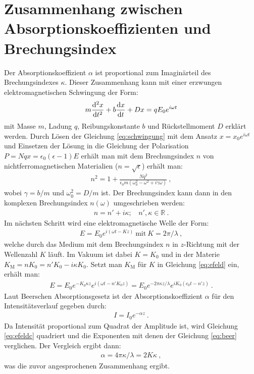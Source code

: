 
\section{Zusammenhang zwischen Absorptionskoeffizienten und Brechungsindex}
\label{sec:absorpBrechung}

Der Absorptionskoeffizient $\alpha$ ist proportional zum Imaginärteil des Brechungsindexes $\kappa$.  Dieser Zusammenhang kann mit einer erzwungen elektromagnetischen Schwingung der Form:
\begin{gather}
    m \derivative[2]{x}{t} + b \derivative{x}{t} + Dx = q E_0e^{i\omega t}
    \label{eq:schwingung}
\end{gather}
mit Masse $m$, Ladung $q$, Reibungskonstante $b$ und Rückstellmoment $D$ erklärt werden. Durch Lösen der Gleichung \ref{eq:schwingung} mit dem Ansatz $x=x_0e^{i\omega t}$ und Einsetzen der Lösung in die Gleichung der Polarisation $P = Nqx = \epsilon_0(\epsilon-1)E$ erhält man mit dem Brechungsindex $n$ von nichtferromagnetischen Materialien ($n = \sqrt{\epsilon}$) erhält man:
\begin{gather}
    n^2 = 1 + \frac{Nq^2}{\epsilon_0 m (\omega_0^2 - \omega^2 + i\gamma\omega)}~,
    \label{eq:brechungsindex}
\end{gather}
wobei $\gamma = b/m$ und $\omega_0^2 = D/m$ ist. Der Brechungsindex kann dann in den komplexen Brechungsindex $n(\omega)$ umgeschrieben werden:
\begin{gather}
    n = n' + i\kappa;~~~~ n',\kappa \in \mathbb{R}~.
\end{gather}
Im nächsten Schritt wird eine elektromagnetische Welle der Form:
\begin{gather}
    E = E_0 e^{i(\omega t - Kz)}~\mathrm{mit}~K = 2\pi/\lambda~,
    \label{eq:efeld}
\end{gather}
welche durch das Medium mit dem Brechungsindex $n$ in $z$-Richtung mit der Wellenzahl $K$ läuft. Im Vakuum ist dabei $K = K_0$ und in der Materie $K_\mathrm{M} = nK_0 = n'K_0 -i\kappa K_0$. Setzt man $K_\mathrm{M}$ für $K$ in Gleichung \ref{eq:efeld} ein, erhält man:
\begin{gather}
    E = E_0e^{-K_0\kappa z}e^{i(\omega t -n'K_0z)} = E_0e^{-2\pi \kappa z/ \lambda}e^{iK_0(c_0 t -n'z)}~.
    \label{eq:efeldc}
\end{gather}
Laut Beerschen Absorptionsgesetz ist der Absorptionskoeffizient $\alpha$ für den Intensitätsverlauf gegeben durch:
\begin{gather}
    I = I_0 e^{-\alpha z}~.
    \label{eq:beer}
\end{gather}
Da Intensität proportional zum Quadrat der Amplitude ist, wird Gleichung \ref{eq:efeldc} quadriert und die Exponenten mit denen der Gleichung \ref{eq:beer} verglichen. Der Vergleich ergibt dann:
\begin{gather}
    \boxed{\alpha = 4 \pi \kappa / \lambda = 2K \kappa}~,
\end{gather}
was die zuvor angesprochenen Zusammenhang ergibt. \cite{DemtroederLaser1}